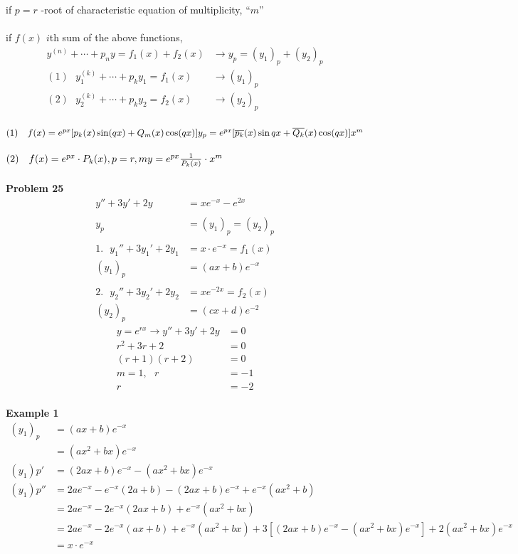 \documentclass[10pt, letterpaper]{article}
\begin{document}
if $p=r$ -root of characteristic equation of multiplicity, ``$m$''\\
\\
if $f(x)$ $i$th sum of the above functions,
\begin{align*}
y^{(n)} +\cdots +p_ny = f_1(x) +f_2(x) &\rightarrow y_p =(y_1)_p +(y_2)_p\\
(1) ~~~ y_1^{(k)} +\cdots +p_ky_1 =f_1(x) &\rightarrow (y_1)_p\\
(2) ~~~ y_2^{(k)} +\cdots +p_ky_2 =f_2(x) &\rightarrow (y_2)_p
\end{align*}
\\
$(1) ~~~ f(x) =e^{px}[p_k(x)\sin(qx) +Q_m(x)\cos(qx)]\\
y_p = e^{px}[\overline{p_k}(x)\sin qx +\overline{Q_k}(x)\cos(qx)]x^m$\\
\\
$(2) ~~~ f(x) =e^{px}\cdot P_k(x), p=r, m\\
y=e^{px} \frac{1}{P_k(x)} \cdot x^m$
\\
\\
\textbf{Problem 25}
\begin{align*}
y'' +3y' +2y &= xe^{-x}-e^{2x}\\
\\
y_p &= (y_1)_p = (y_2)_p\\
\\
1. ~~~ y_1'' +3y_1' +2y_1 &= x\cdot e^{-x} =f_1(x)\\
(y_1)_p &= (ax+b)e^{-x}\\
\\
2. ~~~ y_2'' +3y_2' +2y_2 &= xe^{-2x} = f_2(x)\\
(y_2)_p &= (cx + d)e^{-2}
\end{align*}
\begin{align*}
y=e^{rx} \rightarrow y''+3y'+2y &= 0\\
r^2 +3r +2 &= 0\\
(r+1)(r+2) &= 0\\
m=1, ~~~ r &= -1\\
r &= -2
\end{align*}
\\
\textbf{Example 1}
\begin{align*}
(y_1)_p &= (ax+b)e^{-x}\\
&= (ax^2+bx)e^{-x}\\
(y_1)p' &= (2ax+b)e^{-x}-(ax^2+bx)e^{-x}\\
(y_1)p'' &= 2ae^{-x}-e^{-x}(2a+b)-(2ax+b)e^{-x}+e^{-x}(ax^2+b)\\
&= 2ae^{-x}-2e^{-x}(2ax+b)+e^{-x}(ax^2+bx)\\
&= 2ae^{-x}-2e^{-x}(ax+b)+e^{-x}(ax^2+bx)+3[(2ax+b)e^{-x}-(ax^2+bx)e^{-x}]+2(ax^2+bx)e^{-x}\\
&= x \cdot e^{-x}
\end{align*}
\end{document}
